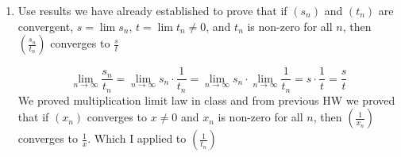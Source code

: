 \documentclass[11pt]{exam}
\begin{document}
\begin{enumerate}
\begin{solution}
            \end{solution}
        \item Use results we have already established to prove that if $(s_n)$ and $(t_n)$ are convergent, $s = \lim s_n$, $t = \lim t_n \neq 0$, and $t_n$ is non-zero for all $n$, then $\left(\frac{s_n}{t_n}\right)$ converges to $\frac{s}{t}$
            \begin{solution}
                $$\lim_{n \to \infty} \frac{s_n}{t_n} = \lim_{n \to \infty} s_n \cdot \frac{1}{t_n} = \lim_{n \to \infty} s_n \cdot \lim_{n \to \infty} \frac{1}{t_n} = s \cdot \frac{1}{t} = \frac{s}{t}$$
                We proved multiplication limit law in class and from previous HW we proved that if $(x_n)$ converges to $x \neq 0$ and $x_n$ is non-zero for all $n$, then $\left(\frac{1}{x_n}\right)$ converges to $\frac{1}{x}$. Which I applied to $\left(\frac{1}{t_n}\right)$
            \end{solution}
    \end{enumerate}
\end{document}
